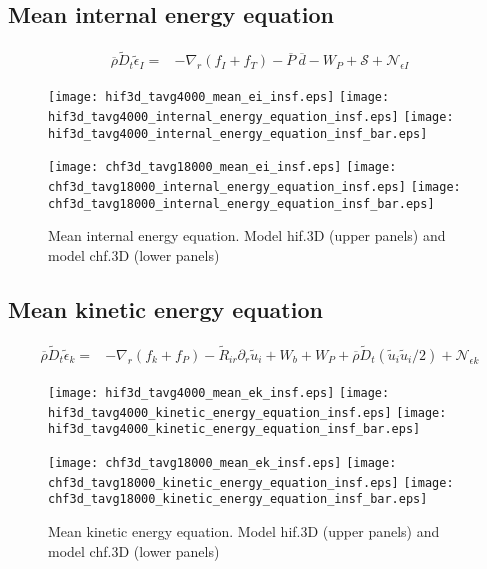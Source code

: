 \documentclass[10pt,paper=a4]{report}
\newcommand{\fht}{\widetilde}
\newcommand{\fav}{\widetilde}
\newcommand{\av}{\overline}
\begin{document}
\newpage
 
\subsection{Mean internal energy equation}

\begin{align}
\av{\rho} \fav{D}_t \fav{\epsilon}_I = & - \nabla_r  ( f_I + f_T ) - \av{P} \ \av{d} - W_P  + {\mathcal S} + {\mathcal N_{\epsilon I}} 
\end{align}

\begin{figure}[!h]
\centerline{
\texttt{[image: hif3d\_tavg4000\_mean\_ei\_insf.eps]}
\texttt{[image: hif3d\_tavg4000\_internal\_energy\_equation\_insf.eps]}
\texttt{[image: hif3d\_tavg4000\_internal\_energy\_equation\_insf\_bar.eps]}}

\centerline{
\texttt{[image: chf3d\_tavg18000\_mean\_ei\_insf.eps]}
\texttt{[image: chf3d\_tavg18000\_internal\_energy\_equation\_insf.eps]}
\texttt{[image: chf3d\_tavg18000\_internal\_energy\_equation\_insf\_bar.eps]}}

\caption{Mean internal energy equation. Model {\sf hif.3D} (upper panels) and model {\sf chf.3D} (lower panels)}
\end{figure}

\newpage
 
\subsection{Mean kinetic energy equation}

\begin{align}
\av{\rho} \fav{D}_t \fav{\epsilon}_k = &  -\nabla_r  ( f_k +  f_P ) - \fht{R}_{ir}\partial_r \fht{u}_i + W_b + W_P +\av{\rho}\fav{D}_t (\fav{u}_i \fav{u}_i / 2) + {\mathcal N_{\epsilon k}} \label{eq:rans_mke} 
\end{align}

\begin{figure}[!h]
\centerline{
\texttt{[image: hif3d\_tavg4000\_mean\_ek\_insf.eps]}
\texttt{[image: hif3d\_tavg4000\_kinetic\_energy\_equation\_insf.eps]}
\texttt{[image: hif3d\_tavg4000\_kinetic\_energy\_equation\_insf\_bar.eps]}}

\centerline{
\texttt{[image: chf3d\_tavg18000\_mean\_ek\_insf.eps]}
\texttt{[image: chf3d\_tavg18000\_kinetic\_energy\_equation\_insf.eps]}
\texttt{[image: chf3d\_tavg18000\_kinetic\_energy\_equation\_insf\_bar.eps]}}

\caption{Mean kinetic energy equation. Model {\sf hif.3D} (upper panels) and model {\sf chf.3D} (lower panels)}
\end{figure}
\end{document}

